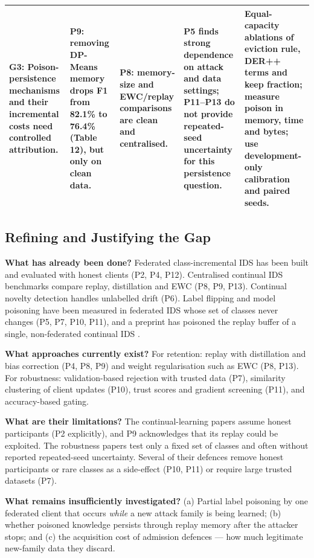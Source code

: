 \documentclass[10pt,a4paper]{article}
\begin{document}
\begin{landscape}
\begin{table}[H]
\begin{tabularx}{\linewidth}{L{3.6cm}Y Y Y L{4.4cm}}
\textbf{G3: Poison-persistence mechanisms and their incremental costs need controlled attribution.}
& P9: removing DP-Means memory drops F1 from 82.1\% to 76.4\% (Table 12), but only on clean data.
& P8: memory-size and EWC/replay comparisons are clean and centralised.
& P5 finds strong dependence on attack and data settings; P11--P13 do not provide repeated-seed uncertainty for this persistence question.
& Equal-capacity ablations of eviction rule, DER++ terms and keep fraction; measure poison in memory, time and bytes; use development-only calibration and paired seeds.\\
\bottomrule
\end{tabularx}
\end{table}
\end{landscape}

\subsection{Refining and Justifying the Gap}
\textbf{What has already been done?} Federated class-incremental IDS has been built and evaluated with honest clients (P2, P4, P12). Centralised continual IDS benchmarks compare replay, distillation and EWC (P8, P9, P13). Continual novelty detection handles unlabelled drift (P6). Label flipping and model poisoning have been measured in federated IDS whose set of classes never changes (P5, P7, P10, P11), and a preprint has poisoned the replay buffer of a single, non-federated continual IDS \cite{replaypoison}.

\textbf{What approaches currently exist?} For retention: replay with distillation and bias correction (P4, P8, P9) and weight regularisation such as EWC (P8, P13). For robustness: validation-based rejection with trusted data (P7), similarity clustering of client updates (P10), trust scores and gradient screening (P11), and accuracy-based gating.

\textbf{What are their limitations?} The continual-learning papers assume honest participants (P2 explicitly), and P9 acknowledges that its replay could be exploited. The robustness papers test only a fixed set of classes and often without reported repeated-seed uncertainty. Several of their defences remove honest participants or rare classes as a side-effect (P10, P11) or require large trusted datasets (P7).

\textbf{What remains insufficiently investigated?} (a) Partial label poisoning by one federated client that occurs \emph{while} a new attack family is being learned; (b) whether poisoned knowledge persists through replay memory after the attacker stops; and (c) the acquisition cost of admission defences --- how much legitimate new-family data they discard.
\end{document}
